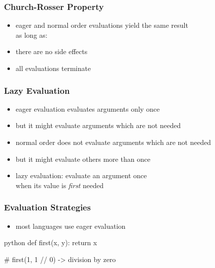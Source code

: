 \documentclass[dvipsnames]{beamer}
\theoremstyle{plain}
\begin{document}
\begin{frame}
  \frametitle{Church-Rosser Property}

  \begin{itemize}
    \item eager and normal order evaluations yield the same result\\
      as long as:

    \bigskip
    \item there are no side effects
    \item all evaluations terminate
  \end{itemize}
\end{frame}

\begin{frame}
  \frametitle{Lazy Evaluation}

  \begin{itemize}
    \item eager evaluation evaluates arguments only once
    \item but it might evaluate arguments which are not needed

    \medskip
    \item normal order does not evaluate arguments which are not needed
    \item but it might evaluate others more than once

    \pause
    \medskip
    \item \alert{lazy evaluation}: evaluate an argument once\\
      when its value is \emph{first} needed
  \end{itemize}
\end{frame}

\begin{frame}[fragile]
  \frametitle{Evaluation Strategies}

  \begin{itemize}
    \item most languages use eager evaluation
  \end{itemize}

  \begin{example}[Python]
    \begin{pygments}{python}
def first(x, y):
    return x

# first(1, 1 // 0) -> division by zero
    \end{pygments}
  \end{example}
\end{frame}
\end{document}
